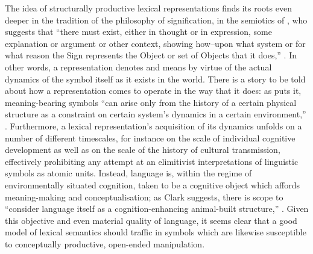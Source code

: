 The idea of structurally productive lexical representations finds its roots even deeper in the tradition of the philosophy of signification, in the semiotics of \citeauthor{Peirce1932}, who suggests that ``there must exist, either in thought or in expression, some explanation or argument or other context, showing how--upon what system or for what reason the Sign represents the Object or set of Objects that it does,'' \cite[][\P 2.230]{Peirce1932}.  In other words, a representation denotes and means by virtue of the actual dynamics of the symbol itself as it exists in the world.  There is a story to be told about how a representation comes to operate in the way that it does: as \citeauthor{RaczaszekLeonardi2012} puts it, meaning-bearing symbols ``can arise only from the history of a certain physical structure as a constraint on certain system’s dynamics in a certain environment,'' \citep[][p. 309]{RaczaszekLeonardi2012}.  Furthermore, a lexical representation's acquisition of its dynamics unfolds on a number of different timescales, for instance on the scale of individual cognitive development as well as on the scale of the history of cultural transmission, effectively prohibiting any attempt at an elimitivist interpretations of linguistic symbols as atomic units.  Instead, language is, within the regime of environmentally situated cognition, taken to be a cognitive object which affords meaning-making and conceptualisation; as Clark suggests, there is scope to ``consider language itself as a cognition-enhancing animal-built structure,'' \citep[][p. 370]{Clark2006}.  Given this objective and even material quality of language, it seems clear that a good model of lexical semantics should traffic in symbols which are likewise susceptible to conceptually productive, open-ended manipulation.

